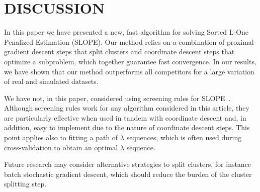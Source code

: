 \section{DISCUSSION}\label{sec:discussion}

In this paper we have presented a new, fast algorithm for solving Sorted L-One Penalized Estimation (SLOPE).
Our method relies on a combination of proximal gradient descent steps that split clusters and coordinate descent steps that optimize a subproblem, which together guarantee fast convergence.
In our results, we have shown that our method outperforms all competitors for a large variation of real and simulated datasets.

We have not, in this paper, considered using screening rules for SLOPE~\parencite{larsson2020c,elvira2022}.
Although screening rules work for any algorithm considered in this article, they are particularly effective when used in tandem with coordinate descent and, in addition, easy to implement due to the nature of coordinate descent steps.
This point applies also to fitting a path of \(\lambda\) sequences, which is often used during cross-validation to obtain an optimal \(\lambda\) sequence. 

Future research may consider alternative strategies to split clusters, for instance batch stochastic gradient descent, which should reduce the burden of the cluster splitting step.
